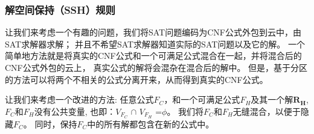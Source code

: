 \subsubsection{解空间保持（SSH）规则}\label{embeded rules}
%
%
%
让我们来考虑一个有趣的问题，我们将SAT问题编码为CNF公式外包到云中，由SAT求解器求解；
并且不希望SAT求解器知道实际的SAT问题以及它的解。
一个简单地方法就是将真实的CNF公式和一个可满足公式混合在一起，并将混合后的CNF公式外包的云上，
真实公式的解将会混杂在混合后的解中。
但是，基于分区\cite{Partition}的方法可以将两个不相关的公式分离开来，从而得到真实的CNF公式。

让我们来考虑一个改进的方法:
任意公式$F_C$，和一个可满足公式$F_H$及其一个解\textsl{${\textbf{R}}_{\textbf{H}}$},
$F_C$和$F_H$没有公共变量, 也即：$V_{F_C}$ $\cap$ $V_{F_H}$ =$\phi$。
我们将$F_C$和$F_H$无缝混合，以便于隐藏$F_C$。
同时，保持$F_C$中的所有解都包含在新的公式中。

